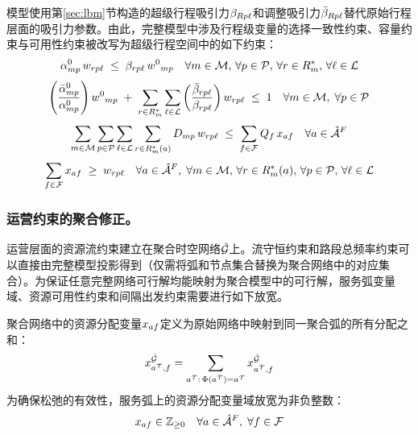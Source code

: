 模型使用第\ref{sec:lbm}节构造的超级行程吸引力$\beta_{Rp\ell}$和调整吸引力$\bar{\beta}_{Rp\ell}$替代原始行程层面的吸引力参数。由此，完整模型中涉及行程级变量的选择一致性约束、容量约束与可用性约束被改写为超级行程空间中的如下约束：
\begin{equation}
    \alpha^0_{mp}\, w_{rp\ell} \;\le\; \beta_{rp\ell}\, {w^0}_{mp}
    \quad \forall m\in \mathcal{M},\, \forall p\in \mathcal{P},\, \forall r\in R^{*}_{m},\, \forall \ell\in \mathcal{L}
    \label{constr:relax.choice.ratio}
\end{equation}
\begin{equation}
    \left(\frac{\bar{\alpha}^0_{mp}}{\alpha^0_{mp}}\right) {w^0}_{mp}
    \;+\;
    \sum_{r\in R^{*}_{m}}\sum_{\ell\in \mathcal{L}} 
    \left(\frac{\bar{\beta}_{rp\ell}}{\beta_{rp\ell}}\right) w_{rp\ell}
    \;\le\; 1
    \quad \forall m\in \mathcal{M},\; \forall p\in \mathcal{P}
    \label{constr:relax.choice.limit}
\end{equation}
\begin{equation}
    \sum_{m\in \mathcal{M}}\sum_{p\in \mathcal{P}}\sum_{\ell\in \mathcal{L}}\sum_{r\in R^{*}_{m}(a)} 
    D_{mp}\, w_{rp\ell}\;\le\; \sum_{f\in \mathcal{F}} Q_{f}\, x_{af}
    \quad \forall a\in {\hat{\mathcal{A}}^F_{{}}}
    \label{constr:relax.choice.capacity}
\end{equation}
\begin{equation}
    \sum_{f\in \mathcal{F}} x_{af} \;\ge\; w_{rp\ell}
    \quad \forall a\in {\hat{\mathcal{A}}^F_{{}}},\; \forall m\in \mathcal{M},\, \forall r\in R^{*}_{m}(a),\, \forall p\in \mathcal{P},\,\forall \ell\in\mathcal{L}
    \label{constr:relax.choice.covering}
\end{equation}

\subsubsection*{运营约束的聚合修正。}
运营层面的资源流约束建立在聚合时空网络$\hat{\mathcal{G}}$上。流守恒约束和路段总频率约束可以直接由完整模型投影得到（仅需将弧和节点集合替换为聚合网络中的对应集合）。为保证任意完整网络可行解均能映射为聚合模型中的可行解，服务弧变量域、资源可用性约束和间隔出发约束需要进行如下放宽。

聚合网络中的资源分配变量$x_{af}$定义为原始网络中映射到同一聚合弧的所有分配之和：
\[
    \fleetAssignVar_{a^{\discretization},f}^{\net} = \sum_{a^{\discretizationFull}:\, \Phi(a^{\discretizationFull}) = a^{\discretization}}\fleetAssignVar_{a^{\discretizationFull},f}^{\full{\net}}
\]
为确保松弛的有效性，服务弧上的资源分配变量域放宽为非负整数：
\begin{equation}
    x_{af}\in\mathbb{Z}_{\ge0} \quad \forall a\in {\hat{\mathcal{A}}^F_{{}}}, \; \forall f\in \mathcal{F}
    \label{constr:relax.domain.x.flight}
\end{equation}

